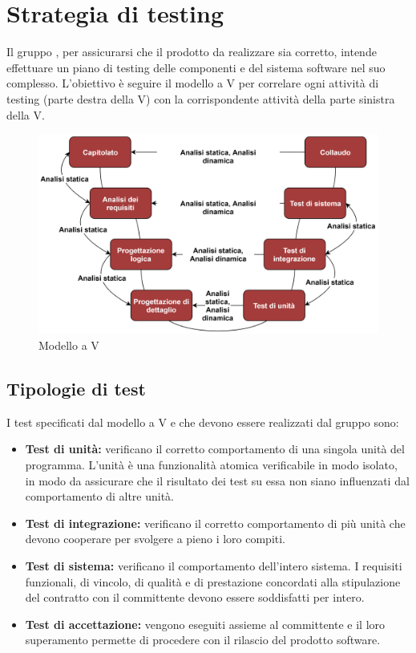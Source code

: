 \section{Strategia di testing}
Il gruppo \Gruppo{}, per assicurarsi che il prodotto da realizzare sia corretto, intende effettuare un piano di testing delle componenti e del sistema software nel suo complesso.
L'obiettivo è seguire il modello a V per correlare ogni attività di testing (parte destra della V) con la corrispondente attività della parte sinistra della V.

\begin{figure}[h]
    \centering
    \includegraphics[scale=0.85]{sezioni/Immagini/Modello_a_V.png}
    \caption{Modello a V}
\end{figure}

\subsection{Tipologie di test}
I test specificati dal modello a V e che devono essere realizzati dal gruppo sono:
\begin{itemize}
    \item \textbf{Test di unità:} verificano il corretto comportamento di una singola unità del programma. L'unità è una funzionalità atomica verificabile in modo isolato, in modo da assicurare che il risultato dei test su essa non siano influenzati dal comportamento di altre unità. 
    \item \textbf{Test di integrazione:} verificano il corretto comportamento di più unità che devono cooperare per svolgere a pieno i loro compiti.
    \item \textbf{Test di sistema:} verificano il comportamento dell'intero sistema. I requisiti funzionali, di vincolo, di qualità e di prestazione concordati alla stipulazione del contratto con il committente devono essere soddisfatti per intero.
    \item \textbf{Test di accettazione:} vengono eseguiti assieme al committente e il loro superamento permette di procedere con il rilascio del prodotto software.
\end{itemize}

